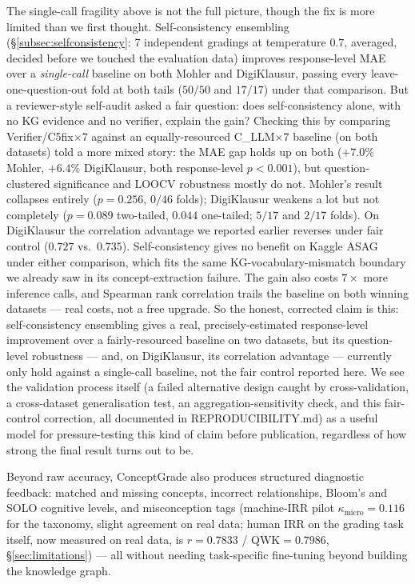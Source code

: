 \documentclass[conference]{IEEEtran}
\begin{document}
The single-call fragility above is not the full picture, though the
fix is more limited than we first thought. Self-consistency ensembling
(\S\ref{subsec:selfconsistency}: 7 independent gradings at temperature
$0.7$, averaged, decided before we touched the evaluation data)
improves response-level MAE over a \emph{single-call} baseline on both
Mohler and DigiKlausur, passing every leave-one-question-out fold at
both tails ($50/50$ and $17/17$) under that comparison. But a
reviewer-style self-audit asked a fair question: does self-consistency
alone, with no KG evidence and no verifier, explain the gain? Checking
this by comparing Verifier/C5fix$\times7$ against an equally-resourced
C\_LLM$\times7$ baseline (on both datasets) told a more mixed story: the
MAE gap holds up on both ($+7.0\%$ Mohler, $+6.4\%$ DigiKlausur, both
response-level $p<0.001$), but question-clustered significance and
LOOCV robustness mostly do not. Mohler's result collapses entirely
($p=0.256$, $0/46$ folds); DigiKlausur weakens a lot but not completely
($p=0.089$ two-tailed, $0.044$ one-tailed; $5/17$ and $2/17$ folds). On
DigiKlausur the correlation advantage we reported earlier reverses under
fair control ($0.727$ vs.\ $0.735$). Self-consistency gives no benefit
on Kaggle ASAG under either comparison, which fits the same
KG-vocabulary-mismatch boundary we already saw in its concept-extraction
failure. The gain also costs $7\times$ more inference calls, and
Spearman rank correlation trails the baseline on both winning datasets
--- real costs, not a free upgrade. So the honest, corrected claim is
this: self-consistency ensembling gives a real, precisely-estimated
response-level improvement over a fairly-resourced baseline on two
datasets, but its question-level robustness --- and, on DigiKlausur, its
correlation advantage --- currently only hold against a single-call
baseline, not the fair control reported here. We see the validation
process itself (a failed alternative design caught by cross-validation,
a cross-dataset generalisation test, an aggregation-sensitivity check,
and this fair-control correction, all documented in
REPRODUCIBILITY.md) as a useful model for pressure-testing this kind of
claim before publication, regardless of how strong the final result
turns out to be.

Beyond raw accuracy, ConceptGrade also produces structured diagnostic
feedback: matched and missing concepts, incorrect relationships,
Bloom's and SOLO cognitive levels, and misconception tags (machine-IRR
pilot $\kappa_{\text{micro}} = 0.116$ for the taxonomy, slight
agreement on real data; human IRR on the grading task itself, now
measured on real data, is $r=0.7833$ /
QWK$=0.7986$, \S\ref{sec:limitations}) --- all without needing
task-specific fine-tuning beyond building the knowledge graph.
\end{document}
